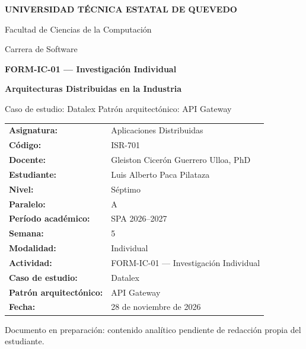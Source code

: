 \documentclass[11pt,a4paper]{article}
\begin{document}
\begin{titlepage}
  \centering
  \vspace*{0.8cm}

  {\Large \textbf{UNIVERSIDAD T\'ECNICA ESTATAL DE QUEVEDO}\par}
  \vspace{0.3cm}
  {\large Facultad de Ciencias de la Computaci\'on\par}
  {\large Carrera de Software\par}

  \vspace{1.4cm}
  {\LARGE \textbf{FORM-IC-01 --- Investigaci\'on Individual}\par}
  \vspace{0.3cm}
  {\Large \textbf{Arquitecturas Distribuidas en la Industria}\par}
  \vspace{0.6cm}
  {\large Caso de estudio: Datalex \textbar{} Patr\'on arquitect\'onico: API Gateway\par}

  \vspace{1.4cm}
  \begin{tabular}{ll}
    \textbf{Asignatura:}                & Aplicaciones Distribuidas \\
    \textbf{C\'odigo:}                  & ISR-701 \\
    \textbf{Docente:}                   & Gleiston Cicer\'on Guerrero Ulloa, PhD \\
    \textbf{Estudiante:}                & Luis Alberto Paca Pilataza \\
    \textbf{Nivel:}                     & S\'eptimo \\
    \textbf{Paralelo:}                  & A \\
    \textbf{Per\'iodo acad\'emico:}     & SPA 2026--2027 \\
    \textbf{Semana:}                    & 5 \\
    \textbf{Modalidad:}                 & Individual \\
    \textbf{Actividad:}                 & FORM-IC-01 --- Investigaci\'on Individual \\
    \textbf{Caso de estudio:}           & Datalex \\
    \textbf{Patr\'on arquitect\'onico:} & API Gateway \\
    \textbf{Fecha:}                     & 28 de noviembre de 2026 \\
  \end{tabular}

  \vfill
  {\small Documento en preparaci\'on: contenido anal\'itico pendiente de redacci\'on propia del estudiante.\par}
\end{titlepage}
\end{document}
